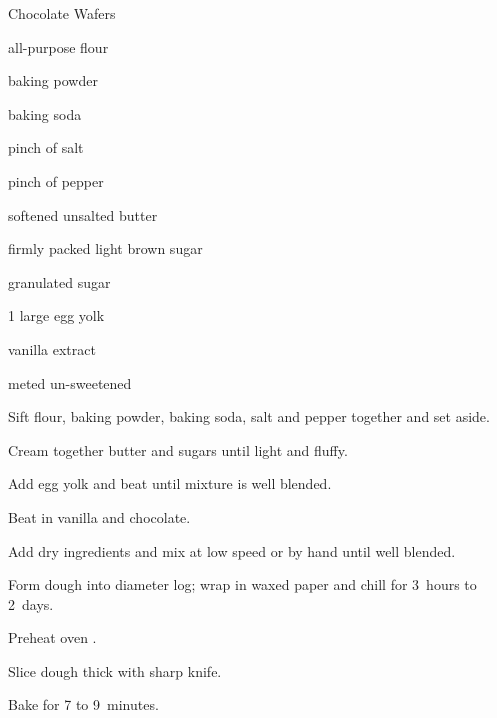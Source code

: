 \begin{recipe}{Chocolate Wafers}{}{}

\begin{ingredients}
\item {} all-purpose flour
\item \tp{\half} baking powder
\item \tp{\quarter} baking soda
\item pinch of salt
\item pinch of pepper
\item \C{\threequarter} softened unsalted butter
\item \C{\quarter} firmly packed light brown sugar
\item \C{\quarter} granulated sugar
\item 1 large egg yolk
\item {} vanilla extract
\item \C{\eighth} meted un-sweetened 
\end{ingredients}

\begin{directions}
\item Sift flour, baking powder, baking soda, salt and pepper together and set aside.
\item Cream together butter and sugars until light and fluffy.
\item Add egg yolk and beat until mixture is well blended.
\item Beat in vanilla and chocolate.
\item Add dry ingredients and mix at low speed or by hand until well blended.
\item Form dough into  diameter log; wrap in waxed paper and chill for 3~hours to 2~days.
\item Preheat oven .
\item Slice dough \cm{\quarter} thick with sharp knife.
\item Bake for 7 to 9~minutes.
\end{directions}

\end{recipe}

